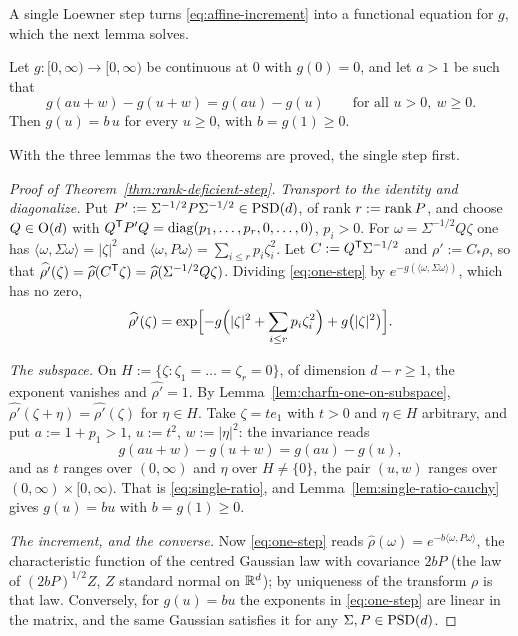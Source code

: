 A single Loewner step turns \ref{eq:affine-increment} into a functional equation for $g$, which the next
lemma solves.

\begin{lemma}\label{lem:single-ratio-cauchy}
Let $g : [0,\infty) \to [0,\infty)$ be continuous at $0$ with $g(0) = 0$, and let $a > 1$ be such
that
\begin{equation}\label{eq:single-ratio}
  g(au + w) - g(u + w) = g(au) - g(u) \qquad \text{for all } u > 0,\ w \ge 0 .
\end{equation}
Then $g(u) = b\,u$ for every $u \ge 0$, with $b = g(1) \ge 0$.
\end{lemma}

With the three lemmas the two theorems are proved, the single step first.



\begin{proof}[Proof of Theorem~\ref{thm:rank-deficient-step}]
\emph{Transport to the identity and diagonalize.} Put $P' := \Sigma^{-1/2}P\Sigma^{-1/2} \in
\mathrm{PSD}(d)$, of rank $r := \operatorname{rank} P$, and choose $Q \in \mathrm{O}(d)$ with
$Q^{\mathsf{T}}P'Q = \operatorname{diag}(p_1,\dots,p_r,0,\dots,0)$, $p_i > 0$. For $\omega = \Sigma^{-1/2}Q\zeta$ one
has $\langle\omega,\Sigma\omega\rangle = |\zeta|^2$ and
$\langle\omega,P\omega\rangle = \sum_{i \le r}p_i\zeta_i^2$. Let $C := Q^{\mathsf{T}}\Sigma^{-1/2}$ and
$\rho' := C_*\rho$, so that $\widehat{\rho'}(\zeta) = \widehat\rho(C^{\mathsf{T}}\zeta)
= \widehat\rho(\Sigma^{-1/2}Q\zeta)$. Dividing \ref{eq:one-step} by
$e^{-g(\langle\omega,\Sigma\omega\rangle)}$, which has no zero,
\[
  \widehat{\rho'}(\zeta) = \exp\Bigl[-g\Bigl(|\zeta|^2 + \sum_{i\le r}p_i\zeta_i^2\Bigr)
     + g\bigl(|\zeta|^2\bigr)\Bigr] .
\]

\emph{The subspace.} On $H := \{\zeta : \zeta_1 = \dots = \zeta_r = 0\}$, of dimension
$d - r \ge 1$, the exponent vanishes and $\widehat{\rho'} = 1$. By
Lemma~\ref{lem:charfn-one-on-subspace}, $\widehat{\rho'}(\zeta + \eta) = \widehat{\rho'}(\zeta)$ for
$\eta \in H$. Take $\zeta = t e_1$ with $t > 0$ and $\eta \in H$ arbitrary, and put
$a := 1 + p_1 > 1$, $u := t^2$, $w := |\eta|^2$: the invariance reads
\[
  g(au + w) - g(u + w) = g(au) - g(u) ,
\]
and as $t$ ranges over $(0,\infty)$ and $\eta$ over $H \ne \{0\}$, the pair $(u,w)$ ranges over
$(0,\infty) \times [0,\infty)$. That is \ref{eq:single-ratio}, and
Lemma~\ref{lem:single-ratio-cauchy} gives $g(u) = bu$ with $b = g(1) \ge 0$.

\emph{The increment, and the converse.} Now \ref{eq:one-step} reads
$\widehat\rho(\omega) = e^{-b\langle\omega,P\omega\rangle}$, the characteristic function of the
centred Gaussian law with covariance $2bP$ (the law of $(2bP)^{1/2}Z$, $Z$ standard normal on
$\mathbb{R}^d$); by uniqueness of the transform $\rho$ is that law. Conversely, for $g(u) = bu$ the
exponents in \ref{eq:one-step} are linear in the matrix, and the same Gaussian satisfies it for any
$\Sigma, P \in \mathrm{PSD}(d)$.
\end{proof}

